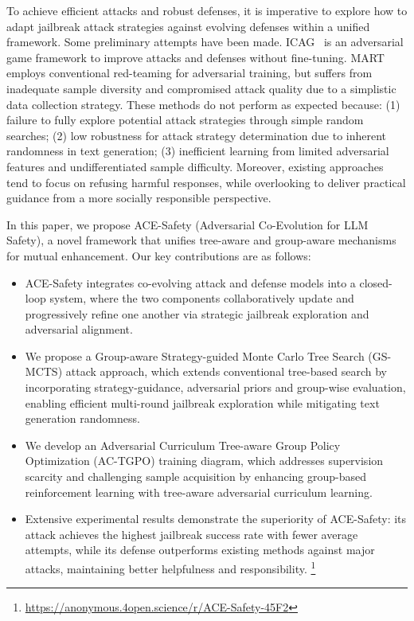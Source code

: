 \documentclass[11pt]{article}
\def\framework{ACE-Safety}
\def\attackmethod{GS-MCTS}
\def\trainingmethod{AC-TGPO}
\begin{document}
To achieve efficient attacks and robust defenses, it is imperative to explore how to adapt jailbreak attack strategies against evolving defenses within a unified framework. Some preliminary attempts have been made. ICAG~\citep{ICAG} is an adversarial game framework to improve attacks and defenses without fine-tuning. MART~\citep{MART} employs conventional red-teaming for adversarial training, but suffers from inadequate sample diversity and compromised attack quality due to a simplistic data collection strategy. These methods do not perform as expected because: (1) failure to fully explore potential attack strategies through simple random searches; (2) low robustness for attack strategy determination due to inherent randomness in text generation; (3) inefficient learning from limited adversarial features and undifferentiated sample difficulty. Moreover, existing approaches tend to focus on refusing harmful responses, while overlooking to deliver practical guidance from a more socially responsible perspective.

In this paper, we propose {\framework} (Adversarial Co-Evolution for LLM Safety), a novel framework that unifies tree-aware and group-aware mechanisms for mutual enhancement. Our key contributions are as follows:

\begin{itemize}[left=0pt]

\item {\framework} integrates co-evolving attack and defense models into a closed-loop system, where the two components collaboratively update and progressively refine one another via strategic jailbreak exploration and adversarial alignment.

\item We propose a Group-aware Strategy-guided Monte Carlo Tree Search ({\attackmethod}) attack approach, which extends conventional tree-based search by incorporating strategy-guidance, adversarial priors and group-wise evaluation, enabling efficient multi-round jailbreak exploration while mitigating text generation randomness.

\item We develop an Adversarial Curriculum Tree-aware Group Policy Optimization ({\trainingmethod}) training diagram, which addresses supervision scarcity and challenging sample acquisition by enhancing group-based reinforcement learning with tree-aware adversarial curriculum learning.

\item Extensive experimental results demonstrate the superiority of {\framework}: its attack achieves the highest jailbreak success rate with fewer average attempts, while its defense outperforms existing methods against major attacks, maintaining better helpfulness and responsibility.
\footnote{\footnotesize{\url{https://anonymous.4open.science/r/ACE-Safety-45F2}}}


\end{itemize}
 
\end{document}

